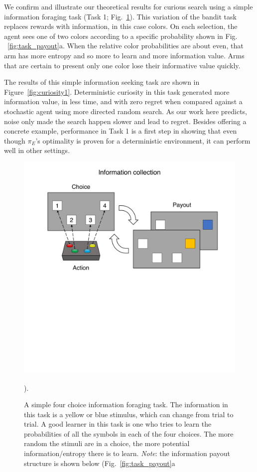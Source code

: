 We confirm and illustrate our theoretical results for curious search using a simple information foraging task (Task 1; Fig.~\ref{fig:task_outline1}). This variation of the bandit task \cite{Sutton2018} replaces rewards with information, in this case colors. On each selection, the agent sees one of two colors according to a specific probability shown in Fig. ~\ref{fig:task_payout}a. When the relative color probabilities are about even, that arm has more entropy and so more to learn and more information value. Arms that are certain to present only one color lose their informative value quickly.

The results of this simple information seeking task are shown in Figure~\ref{fig:curiosity1}. Deterministic curiosity in this task generated more information value, in less time, and with zero regret when compared against a stochastic agent using more directed random search. As our work here predicts, noise only made the search happen slower and lead to regret. Besides offering a concrete example, performance in Task 1 is a first step in showing that even though $\pi_E$'s optimality is proven for a deterministic environment, it can perform well in other settings.

\begin{figure}

	\includegraphics[width=0.7\linewidth]{img/task_outline1.pdf} 
	\caption{A simple four choice information foraging task. The information in this task is a yellow or blue stimulus, which can change from trial to trial. A good learner in this task is one who tries to learn the probabilities of all the symbols in each of the four choices. The more random the stimuli are in a choice, the more potential information/entropy there is to learn. \textit{Note}: the information payout structure is shown below (Fig.~\ref{fig:task_payout}a}).
	\label{fig:task_outline1} 
\end{figure}

